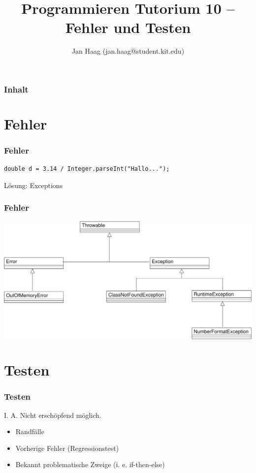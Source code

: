 \documentclass{beamer}
\author{Jan Haag (jan.haag@student.kit.edu)}
\title{Programmieren Tutorium 10 -- Fehler und Testen}
\institute{Institut f\"{u}r Zeritfizierbare und Vertrauensw\"{u}rdige Informatiksysteme (ZVI)}
\begin{document}
\begin{frame}
\maketitle
\end{frame}

\begin{frame}
\frametitle{Inhalt}
\tableofcontents
\end{frame}

\section{Fehler}
\begin{frame}[fragile]
\frametitle{Fehler}
\begin{verbatim}
double d = 3.14 / Integer.parseInt("Hallo...");
\end{verbatim}
\pause
L\"{o}sung: Exceptions
\end{frame}

\begin{frame}[fragile]
\frametitle{Fehler}
\includegraphics[scale=0.5]{ThrowableClasses.pdf}
\end{frame}

\section{Testen}
\begin{frame}
\frametitle{Testen}
I. A. Nicht ersch\"{o}pfend m\"{o}glich.
\pause
\begin{itemize}
\item Randf\"{a}lle
\item Vorherige Fehler (Regressionstest)
\item Bekannt problematische Zweige (i. e. if-then-else)
\end{itemize}
\end{frame}
\end{document}
